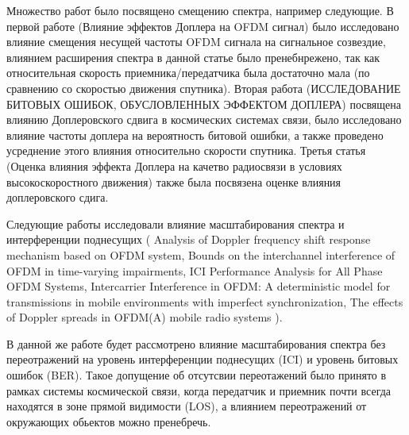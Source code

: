 Множество работ было посвящено смещению спектра, например следующие. %
В первой работе (Влияние эффектов Доплера на {OFDM} сигнал) было исследовано влияние смещения несущей частоты OFDM сигнала
 на сигнальное созвездие, влиянием расширения спектра в данной статье было пренебнрежено, так как относительная скорость приемника/передатчика
  была достаточно мала (по сравнению со скоростью движения спутника). Вторая работа (ИССЛЕДОВАНИЕ БИТОВЫХ ОШИБОК, ОБУСЛОВЛЕННЫХ ЭФФЕКТОМ ДОПЛЕРА)
посвящена влиянию Доплеровского сдвига в космических системах связи, было исследовано влияние частоты доплера на вероятность битовой ошибки,
а также проведено усреднение этого влияния относительно скорости спутника. Третья статья (Оценка влияния эффекта Доплера на качетво радиосвязи в условиях высокоскоростного движения)
также была посвязена оценке влияния доплеровского сдига.


Следующие работы исследовали влияние масштабирования спектра и интерференции поднесущих
(
Analysis of Doppler frequency shift response mechanism based on OFDM system,
Bounds on the interchannel interference of OFDM in time-varying impairments,
ICI Performance Analysis for All Phase OFDM Systems,
Intercarrier Interference in OFDM: A deterministic model for transmissions in mobile environments with imperfect synchronization,
The effects of Doppler spreads in OFDM(A) mobile radio systems
).

В данной же работе будет рассмотрено влияние масштабирования спектра
без переотражений на уровень интерференции поднесущих (ICI) и уровень битовых ошибок (BER).
Такое допущение об отсутсвии переотажений было принято в рамках системы космической связи,
когда передатчик и приемник почти всегда находятся в зоне прямой видимости (LOS), а
влиянием переотражений от окружающих обьектов можно пренебречь.

